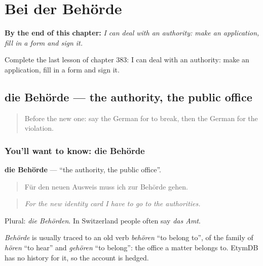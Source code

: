 
\chapter{Bei der Behörde}
\label{ch:ge-bei-der-behorde}

\begin{chapteropening}
\textbf{By the end of this chapter:} \emph{I can deal with an authority: make an application, fill in a form and sign it.}

Complete the last lesson of chapter 383: I can deal with an authority: make an application, fill in a form and sign it.
\end{chapteropening}

\section[die Behörde]{die Behörde — the authority, the public office}

\label{lesson:GE-C383-behoerde}



\begin{quote}
Before the new one: say the German for to break, then the German for the violation.
\end{quote}

\subsection*{You'll want to know: die Behörde}
\textbf{die Behörde} — \textquotedblleft{}the authority, the public office\textquotedblright{}.

\begin{quote}
Für den neuen Ausweis muss ich zur Behörde gehen.
\end{quote}

\begin{quote}
\emph{For the new identity card I have to go to the authorities.}
\end{quote}

Plural: \emph{die Behörden}. In Switzerland people often say \emph{das Amt}.

\begin{cousinweb}
\emph{Behörde} is usually traced to an old verb \emph{behören} \textquotedblleft{}to belong to\textquotedblright{}, of the family of \emph{hören} \textquotedblleft{}to hear\textquotedblright{} and \emph{gehören} \textquotedblleft{}to belong\textquotedblright{}: the office a matter belongs to. EtymDB has no history for it, so the account is hedged.
\end{cousinweb}

